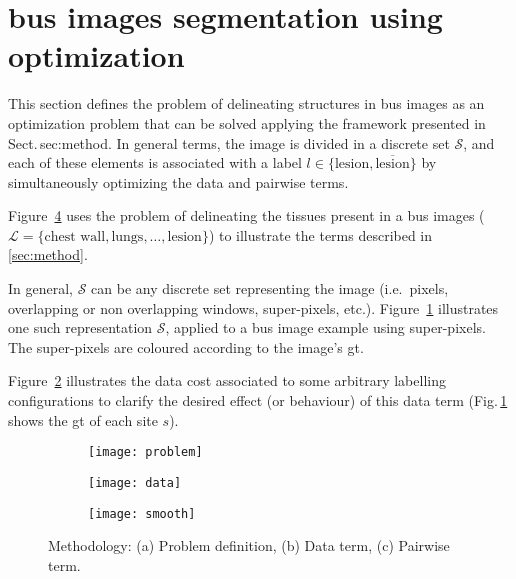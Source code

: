 \section{\ac{bus} images segmentation using optimization}\label{sec:methodApp}

This section defines the problem of delineating structures in \ac{bus} images as an optimization problem that can be solved applying the framework presented in Sect.\,{sec:method}.
In general terms, the image is divided in a discrete set $\mathcal{S}$, and each of these elements is associated with a label $l \in \{\text{lesion}, \overline{\text{lesion}}\}$ by simultaneously optimizing the data and pairwise terms. 

Figure~\ref{fig:methodterms} uses the problem of delineating the tissues present in a \ac{bus} images ($\mathcal{L} = \{ \text{chest wall}, \text{lungs}, \dots, \text{lesion} \}$) to illustrate the terms described in \cref{sec:method}. 

{\color{red}
In general, $\mathcal{S}$ can be any discrete set representing the image (i.e.\, pixels, overlapping or non overlapping windows, super-pixels, etc.). 
Figure~\ref{fig:methodTerms:problem} illustrates one such representation $\mathcal{S}$, applied to a \ac{bus} image example using super-pixels. The super-pixels are coloured according to the image's \ac{gt}.

Figure~\ref{fig:methodTerms:data} illustrates the data cost associated to some arbitrary labelling configurations to clarify the desired effect (or behaviour) of this data term (Fig.\,\ref{fig:methodTerms:problem} shows the \ac{gt} of each site $s$).
}

\begin{figure}
    \centering
    \begin{subfigure}[b]{0.19\textwidth}
        \centering
        \texttt{[image: problem]}
        \label{fig:methodTerms:problem}
    \end{subfigure}
    \hfill
    \begin{subfigure}[b]{0.39\textwidth}  
        \centering 
        \texttt{[image: data]}
        \label{fig:methodTerms:data}
    \end{subfigure}
    \hfill
    \begin{subfigure}[b]{0.39\textwidth}   
        \centering 
        \texttt{[image: smooth]} 
        \label{fig:methodTerms:boundary}
    \end{subfigure}
    \caption {\small Methodology: (a) Problem definition, (b) Data term, (c) Pairwise term.} 
    \label{fig:methodterms}
\end{figure}


